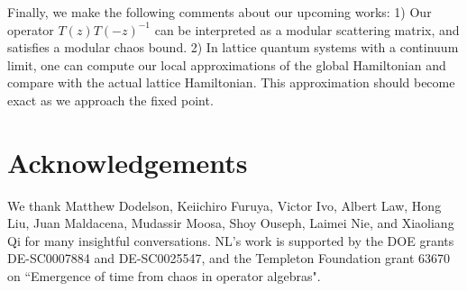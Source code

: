 \documentclass[a4paper,11pt]{article}
\theoremstyle{definition}
\newcommand{\p}{\partial}
\begin{document}
Finally, we make the following comments about our upcoming works: 1) Our operator $T(z)T(-z)^{-1}$ can be interpreted as a modular scattering matrix, and satisfies a modular chaos bound. 2) In lattice quantum systems with a continuum limit, one can compute our local approximations of the global Hamiltonian and compare with the actual lattice Hamiltonian. This approximation should become exact as we approach the fixed point.

















\section*{Acknowledgements}
We thank Matthew Dodelson, Keiichiro Furuya, Victor Ivo, Albert Law, Hong Liu, Juan Maldacena, Mudassir Moosa, Shoy Ouseph, Laimei Nie, and Xiaoliang Qi for many insightful conversations. NL’s work is supported by the DOE grants DE-SC0007884 and DE-SC0025547, and the Templeton Foundation grant 63670 on ``Emergence of time from chaos in operator algebras".
\end{document}
